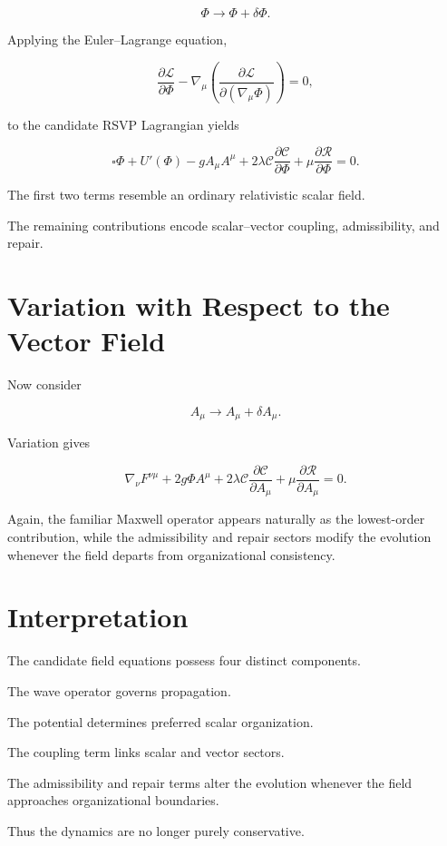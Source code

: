 \documentclass[11pt,oneside]{book}
\numberwithin{equation}{chapter}
\theoremstyle{definition}
\theoremstyle{plain}
\begin{document}
\[
\Phi
\rightarrow
\Phi+\delta\Phi.
\]

Applying the Euler--Lagrange equation,

\[
\frac{\partial\mathcal L}{\partial\Phi}
-
\nabla_\mu
\left(
\frac{\partial\mathcal L}
{\partial(\nabla_\mu\Phi)}
\right)
=0,
\]

to the candidate RSVP Lagrangian yields

\[
\boxed{
\square\Phi
+
U'(\Phi)
-
gA_\mu A^\mu
+
2\lambda
\mathcal C
\frac{\partial\mathcal C}{\partial\Phi}
+
\mu
\frac{\partial\mathcal R}{\partial\Phi}
=
0.
}
\]

The first two terms resemble an ordinary relativistic scalar field.

The remaining contributions encode scalar--vector coupling, admissibility,
and repair.

\section{Variation with Respect to the Vector Field}

Now consider

\[
A_\mu
\rightarrow
A_\mu+\delta A_\mu.
\]

Variation gives

\[
\nabla_\nu
F^{\nu\mu}
+
2g\Phi A^\mu
+
2\lambda
\mathcal C
\frac{\partial\mathcal C}{\partial A_\mu}
+
\mu
\frac{\partial\mathcal R}
{\partial A_\mu}
=
0.
\]

Again, the familiar Maxwell operator appears naturally as the lowest-order
contribution, while the admissibility and repair sectors modify the
evolution whenever the field departs from organizational consistency.

\section{Interpretation}

The candidate field equations possess four distinct components.

The wave operator governs propagation.

The potential determines preferred scalar organization.

The coupling term links scalar and vector sectors.

The admissibility and repair terms alter the evolution whenever the field
approaches organizational boundaries.

Thus the dynamics are no longer purely conservative.
\end{document}
